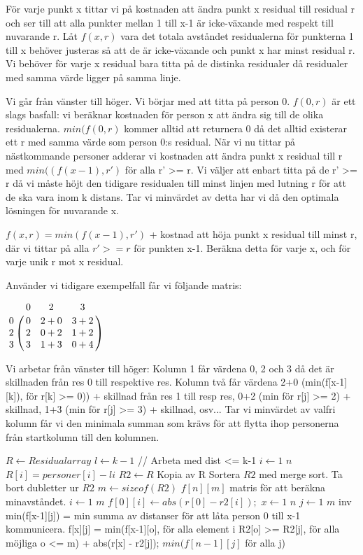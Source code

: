 \documentclass[11pt,a4paper,article,oneside]{memoir}
\begin{document}
För varje punkt x tittar vi på kostnaden att ändra punkt x residual till residual r och ser 
till att alla punkter mellan 1 till x-1 är icke-växande med respekt till nuvarande r.
Låt $f(x, r)$ vara det totala avståndet residualerna för punkterna 1 till x behöver justeras så att de är icke-växande
och punkt x har minst residual r. Vi behöver för varje x residual bara titta på de distinka residualer då residualer med samma värde ligger på samma linje.

Vi går från vänster till höger. Vi börjar med att titta på person 0. $f(0, r)$ är ett slags basfall: vi beräknar 
kostnaden för person x att ändra sig till de olika residualerna. $min(f(0,r)$ kommer alltid att returnera 0 då det
alltid existerar ett r med samma värde som person 0:s residual. När vi nu tittar på nästkommande personer adderar vi kostnaden
att ändra punkt x residual till r med $min((f(x-1),r')$ för alla r' >= r. Vi väljer att enbart titta på de r' >= r då vi måste
höjt den tidigare residualen till minst linjen med lutning r för att de ska vara inom k distans. Tar vi minvärdet av detta har
vi då den optimala lösningen för nuvarande x.

$f(x, r) = min(f(x-1),r')$ + kostnad att höja punkt x residual till minst r, där vi tittar på alla  $r' >= r$ för punkten x-1.
Beräkna detta för varje x, och för varje unik r mot x residual.

Använder vi tidigare exempelfall får vi följande matris:

$\bordermatrix{ ~ & 0 & 2 & 3 \cr 0 & 0 & 2+0 & 3+2 \cr 2 & 2 & 0+2 & 1+2 \cr 3 & 3 & 1+3 & 0+4 \cr}$

Vi arbetar från vänster till höger: Kolumn 1 får värdena 0, 2 och 3 då det är skillnaden från res 0 till respektive res.
Kolumn två får värdena 2+0 (min(f[x-1][k]), för r[k] >= 0)) + skillnad från res 1 till resp res, 0+2 (min för r[j] >= 2) + skillnad,
1+3 (min för r[j] >= 3) + skillnad, osv... Tar vi minvärdet av valfri kolumn får vi den minimala summan som krävs för att flytta ihop personerna 
från startkolumn till den kolumnen.

\begin {codebox}
\zi $R \gets Residualarray$
\zi $l \gets k-1$ // Arbeta med dist <= k-1
\zi \For $i \gets 1$ \To $n$ 
\zi \Do $R[i] = personer[i] - li$
\End
\zi $R2 \gets R$ \Comment Kopia av R
\zi Sortera $R2$ med merge sort.
\zi Ta bort dubletter ur $R2$ 
\zi $m \gets sizeof(R2)$
\zi $f[n][m]$ \Comment matris för att beräkna minavståndet.
\zi \For $i \gets 1$ \To $m$
\zi \Do $f[0][i] \gets abs(r[0] - r2[i]);$
\End
\zi \For $x \gets 1$ \To $n$ \Indentmore
\zi \For $j \gets 1$ \To $m$
\zi inv min(f[x-1][j]) = min summa av distanser för att låta person 0 till x-1 kommunicera.
\zi \Do f[x][j] = min(f[x-1][o], för alla element i R2[o] >= R2[j], för alla möjliga o <= m) 
\Indentmore
\zi + abs(r[x] - r2[j]); 
\End
\End
\End
\zi \Return $min(f[n-1][j]$ för alla j)
\end {codebox}
\end{document}
